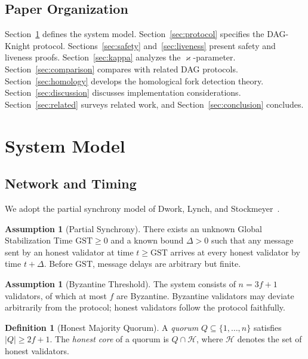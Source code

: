 \documentclass[11pt,a4paper]{article}
\theoremstyle{definition}
\newtheorem{definition}[theorem]{Definition}
\newtheorem{assumption}[theorem]{Assumption}
\theoremstyle{remark}
\newcommand{\DK}{\textsf{DAG-Knight}}
\newcommand{\GST}{\mathrm{GST}}
\newcommand{\honest}{\mathcal{H}}
\renewcommand{\kappa}{\varkappa}
\begin{document}
\subsection{Paper Organization}

Section~\ref{sec:model} defines the system model.
Section~\ref{sec:protocol} specifies the \DK{} protocol.
Sections~\ref{sec:safety} and~\ref{sec:liveness} present safety and
liveness proofs.
Section~\ref{sec:kappa} analyzes the $\kappa$-parameter.
Section~\ref{sec:comparison} compares with related DAG protocols.
Section~\ref{sec:homology} develops the homological fork detection theory.
Section~\ref{sec:discussion} discusses implementation considerations.
Section~\ref{sec:related} surveys related work, and
Section~\ref{sec:conclusion} concludes.

\section{System Model}\label{sec:model}

\subsection{Network and Timing}

We adopt the partial synchrony model of Dwork, Lynch, and
Stockmeyer~\cite{dwork1988consensus}.

\begin{assumption}[Partial Synchrony]\label{asm:partial-sync}
There exists an unknown Global Stabilization Time $\GST \geq 0$ and a
known bound $\Delta > 0$ such that any message sent by an honest validator
at time $t \geq \GST$ arrives at every honest validator by time
$t + \Delta$.
Before $\GST$, message delays are arbitrary but finite.
\end{assumption}

\begin{assumption}[Byzantine Threshold]\label{asm:byz}
The system consists of $n = 3f + 1$ validators, of which at most $f$ are
Byzantine.
Byzantine validators may deviate arbitrarily from the protocol; honest
validators follow the protocol faithfully.
\end{assumption}

\begin{definition}[Honest Majority Quorum]\label{def:quorum}
A \emph{quorum} $Q \subseteq \{1, \ldots, n\}$ satisfies $|Q| \geq 2f+1$.
The \emph{honest core} of a quorum is $Q \cap \honest$, where $\honest$
denotes the set of honest validators.
\end{definition}
\end{document}
